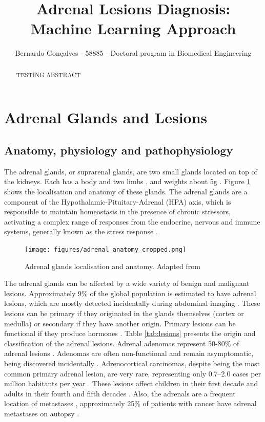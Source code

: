 \documentclass[11pt]{article}
\title{Adrenal Lesions Diagnosis: Machine Learning Approach}
\author{Bernardo Gonçalves - 58885 - Doctoral program in Biomedical Engineering}
\begin{document}
\maketitle

\begin{abstract}

TESTING ABSTRACT

\end{abstract}
\section{Adrenal Glands and Lesions}
\subsection{Anatomy, physiology and pathophysiology}
\label{subsec:anot}

The adrenal glands, or suprarenal glands, are two small glands located on top of
the kidneys.  Each has a body and two limbs \cite{Baba2012}, and weights about
5g \cite{brit}. Figure \ref{fig:adrenal_ana} shows the localisation and anatomy
of these glands. The adrenal glands are a component of the
Hypothalamic-Pituitary-Adrenal (HPA) axis, which is responsible to maintain
homeostasis in the presence of chronic stressors, activating a complex range of
responses from the endocrine, nervous and immune systems, generally known as the
stress response \cite{open}.

\begin{figure}
    \centering
    \texttt{[image: figures/adrenal\_anatomy\_cropped.png]}
    \caption{Adrenal glands localisation and anatomy.  Adapted from \cite{Grossman2022}}
    \label{fig:adrenal_ana}
\end{figure}

The adrenal glands can be affected by a wide variety of benign and malignant
lesions. Approximately 9\% of the global population is estimated to have adrenal
lesions, which are mostly detected incidentally during abdominal imaging
\cite{Dhamija2015}. These lesions can be primary if they originated in the
glands themselves (cortex or medulla) or secondary if they have another origin.
Primary lesions can be functional if they produce hormones \cite{Panda2015}.
Table \ref{tab:lesions} presents the origin and classification of the adrenal lesions.
Adrenal adenomas represent 50-80\% of adrenal lesions \cite{Bracci2022}. Adenomas
are often non-functional and remain asymptomatic, being discovered incidentally
\cite{Platzek2019}. Adrenocortical carcinomas, despite being the most common
primary adrenal lesion, are very rare, representing only 0.7–2.0 cases per million
habitants per year \cite{Bracci2022}. These lesions affect children in their
first decade and adults in their fourth and fifth decades \cite{Panda2015}.
Also, the adrenals are a frequent location of metastases \cite{Platzek2019},
approximately 25\% of patients with cancer have adrenal metastases on autopsy
\cite{Bracci2022}.
\end{document}
